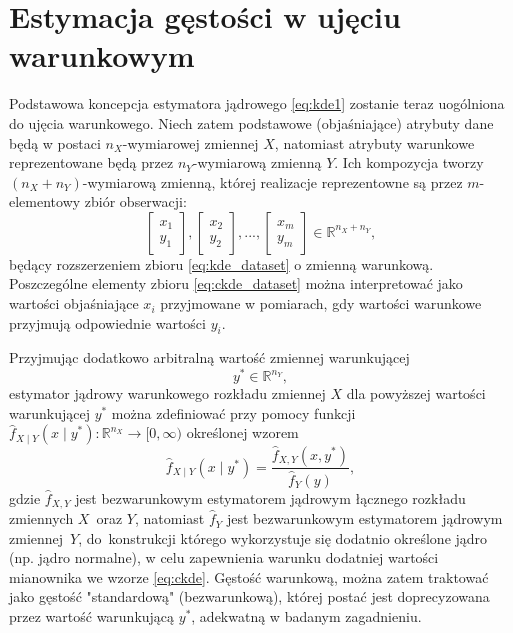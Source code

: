 \documentclass[12pt,a4paper,oneside]{book}
\theoremstyle{definition}
\begin{document}
\section{Estymacja gęstości w ujęciu warunkowym} \label{sec:ckde}
Podstawowa koncepcja estymatora jądrowego \eqref{eq:kde1} zostanie teraz uogólniona do ujęcia warunkowego. Niech zatem podstawowe (objaśniające) atrybuty dane będą w postaci $n_X$-wymiarowej zmiennej $X$, natomiast atrybuty warunkowe reprezentowane będą przez $n_Y$-wymiarową zmienną $Y$. Ich kompozycja tworzy $(n_X+n_Y)$-wymiarową zmienną, której realizacje reprezentowne są przez $m$-elementowy zbiór obserwacji:
\begin{equation}\label{eq:ckde_dataset}
\begin{bmatrix}
x_1 \\
y_1
\end{bmatrix},
\begin{bmatrix}
x_2 \\
y_2
\end{bmatrix},
...,
\begin{bmatrix}
x_m \\
y_m
\end{bmatrix} \in \mathbb{R}^{n_X+n_Y},
\end{equation}
będący rozszerzeniem zbioru \eqref{eq:kde_dataset} o zmienną warunkową. Poszczególne elementy zbioru \eqref{eq:ckde_dataset} można interpretować jako wartości objaśniające $x_i$ przyjmowane w pomiarach, gdy wartości warunkowe przyjmują odpowiednie wartości $y_i$.

Przyjmując dodatkowo arbitralną wartość zmiennej warunkującej
\begin{equation}
y^* \in \mathbb{R}^{n_Y},
\end{equation}
estymator jądrowy warunkowego rozkładu zmiennej $X$ dla powyższej wartości warunkującej $y^*$ można zdefiniować przy pomocy funkcji $\hat{f}_{X \mid Y}(x \mid y^*):\mathbb{R}^{n_X} \rightarrow [0,\infty)$ określonej wzorem
\begin{equation} \label{eq:ckde}
\hat{f}_{X \mid Y}(x \mid y^*) = \frac{\hat{f}_{X,Y}(x,y^*)}{\hat{f}_Y(y)},
\end{equation}
gdzie $\hat{f}_{X,Y}$ jest bezwarunkowym estymatorem jądrowym łącznego rozkładu zmiennych $X$~oraz $Y$, natomiast $\hat{f}_Y$ jest bezwarunkowym estymatorem jądrowym zmiennej~$Y$, do~konstrukcji którego wykorzystuje się dodatnio określone jądro (np. jądro normalne), w celu zapewnienia warunku dodatniej wartości mianownika we wzorze \eqref{eq:ckde}. Gęstość warunkową, można zatem traktować jako gęstość "standardową" (bezwarunkową), której postać jest doprecyzowana przez wartość warunkującą $y^*$, adekwatną w badanym zagadnieniu.
\end{document}
